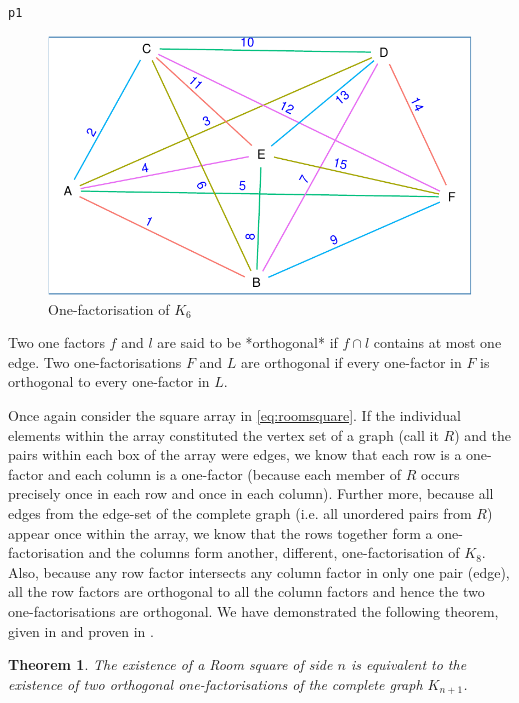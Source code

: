 \documentclass[
  11pt,
  a4paper]{book}\usepackage[]{graphicx}\usepackage[]{xcolor}
\makeatletter
\def\maxwidth{ %
  \ifdim\Gin@nat@width>\linewidth
    \linewidth
  \else
    \Gin@nat@width
  \fi
}
\newcommand{\hlstd}[1]{\textcolor[rgb]{0.345,0.345,0.345}{#1}}%
\newenvironment{kframe}{%
 \def\at@end@of@kframe{}%
 \ifinner\ifhmode%
  \def\at@end@of@kframe{\end{minipage}}%
  \begin{minipage}{\columnwidth}%
 \fi\fi%
 \def\FrameCommand##1{\hskip\@totalleftmargin \hskip-\fboxsep
 \colorbox{shadecolor}{##1}\hskip-\fboxsep
     \hskip-\linewidth \hskip-\@totalleftmargin \hskip\columnwidth}%
 \MakeFramed {\advance\hsize-\width
   \@totalleftmargin\z@ \linewidth\hsize
   \@setminipage}}%
 {\par\unskip\endMakeFramed%
 \at@end@of@kframe}
\newenvironment{knitrout}{}{} %
\def\maxwidth{\ifdim\Gin@nat@width>\linewidth\linewidth\else\Gin@nat@width\fi}
\newtheorem{theorem}{Theorem}
\makeatother
\begin{document}
\begin{knitrout}
\begin{kframe}
\begin{alltt}
\hlstd{p1}
\end{alltt}
\end{kframe}\begin{figure}
\includegraphics[width=\maxwidth]{figure/one-factorisation-1} \caption[One-factorisation of $K_6$]{One-factorisation of $K_6$}\label{fig:one-factorisation}
\end{figure}

\end{knitrout}

Two one factors $f$ and $l$ are said to be *orthogonal* if
$f \cap l$ contains at most one edge. Two one-factorisations
$F$ and $L$ are orthogonal if every one-factor in $F$ is
orthogonal to every one-factor in $L$.

Once again consider the square array in
\eqref{eq:roomsquare}.
If the individual elements within the array constituted the
vertex set of a graph (call it $R$) and the pairs within
each box of the array were edges, we know that each row is a
one-factor and each column is a one-factor (because each
member of $R$ occurs precisely once in each row and once in
each column). Further more, because all edges from the
edge-set of the complete graph (i.e. all unordered pairs
from $R$) appear once within the array, we know that the
rows together form a one-factorisation and the columns form
another, different, one-factorisation of $K_8$. Also,
because any row factor intersects any column factor in only
one pair (edge), all the row factors are orthogonal to all
the column factors and hence the two one-factorisations are
orthogonal. We have demonstrated the following theorem,
given in
\cite{dinitzContemporaryDesignTheory1992}
and proven in
\cite{nemethStudyRoomSquares1969}.

\begin{theorem}
The existence of a Room square of side $n$
is equivalent to the existence of two orthogonal
one-factorisations of the complete graph $K_{n+1}$.
\end{theorem}
\end{document}
